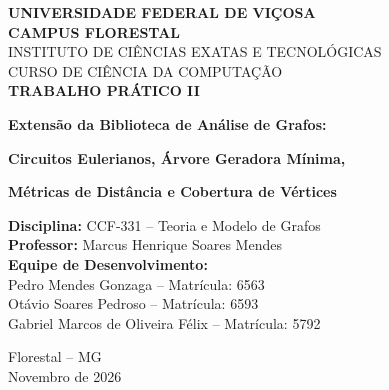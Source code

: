 \documentclass[12pt,a4paper]{article}
\begin{document}
\begin{titlepage}
    \centering
    {\large \textbf{UNIVERSIDADE FEDERAL DE VIÇOSA}}\\[0.2cm]
    {\large \textbf{CAMPUS FLORESTAL}}\\[0.2cm]
    {\large INSTITUTO DE CIÊNCIAS EXATAS E TECNOLÓGICAS}\\[0.2cm]
    {\large CURSO DE CIÊNCIA DA COMPUTAÇÃO}\\[2.5cm]

    {\Large \textbf{TRABALHO PRÁTICO II}}\\[0.6cm]
    {\LARGE \textbf{Extensão da Biblioteca de Análise de Grafos:}\par}
    \vspace{0.3cm}
    {\Large \textbf{Circuitos Eulerianos, Árvore Geradora Mínima,}\par}
    \vspace{0.2cm}
    {\Large \textbf{Métricas de Distância e Cobertura de Vértices}\par}
    \vspace{2.5cm}

    \begin{flushleft}
        \textbf{Disciplina:} CCF-331 -- Teoria e Modelo de Grafos\\
        \textbf{Professor:} Marcus Henrique Soares Mendes\\[0.8cm]
        \textbf{Equipe de Desenvolvimento:}\\
        Pedro Mendes Gonzaga -- Matrícula: 6563\\
        Otávio Soares Pedroso -- Matrícula: 6593\\
        Gabriel Marcos de Oliveira Félix -- Matrícula: 5792
    \end{flushleft}

    \vfill
    {\large Florestal -- MG}\\
    {\large Novembro de 2026}
\end{titlepage}

\tableofcontents
\newpage

\end{document}
